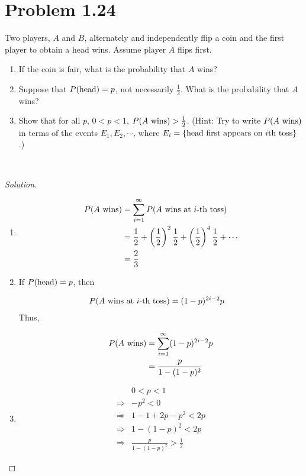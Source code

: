 \documentclass[12pt,letterpaper,reqno]{amsart}
\numberwithin{equation}{subsection}
\begin{document}
\newpage
\section{Problem 1.24}

Two players, $A$ and $B$, alternately and independently flip a coin and the first player to obtain a head wins. Assume player $A$ flips first.

\begin{enumerate}[label=(\alph*),leftmargin=*]
    \item If the coin is fair, what is the probability that $A$ wins?
    \item Suppose that ${P}\! \left( {\mbox{head}} \right) = p$, not necessarily $\frac{1}{2}$. What is the probability that $A$ wins?
    \item Show that for all $p$, $0 < p < 1$, ${P}\! \left( {\mbox{$A$ wins}} \right) > \frac{1}{2}$. (Hint: Try to write ${P}\! \left( {\mbox{$A$ wins}} \right)$ in terms of the events $E_1, E_2, \cdots$, where $E_i = \left\{ {\mbox{head first appears on $i$th toss}} \right\}$.)
\end{enumerate}~\\

\begin{proof}[Solution]~\\

\begin{enumerate}[label=(\alph*),leftmargin=*]
    \item 
    
    \begin{align*}
        {P}\! \left( {\mbox{$A$ wins}} \right) &= \sum_{i=1}^{\infty} {P}\! \left( {\mbox{$A$ wins at $i$-th toss}} \right) \\
        &= \frac{1}{2} + \left(\frac{1}{2} \right)^2 \frac{1}{2} + \left(\frac{1}{2} \right)^4 \frac{1}{2} + \cdots \\
        &= \frac{2}{3}
    \end{align*}
    
    \item If ${P}\! \left( {\mbox{head}} \right) = p$, then
    
    \begin{align*}
        {P}\! \left( {\mbox{$A$ wins at $i$-th toss}} \right) &= (1-p)^{2i-2}p
    \end{align*}
    Thus,
    
    \begin{align*}
        {P}\! \left( {\mbox{$A$ wins}} \right) &= \sum_{i=1}^{\infty} (1-p)^{2i-2}p \\
        &= \frac{p}{1-(1-p)^2}
    \end{align*}
    
    \item
    
    \begin{align*}
        & 0 < p < 1 \\
        \Rightarrow & -p^2 < 0 \\
        \Rightarrow & 1-1+2p-p^2 < 2p \\
        \Rightarrow & 1-(1-p)^2 < 2p \\
        \Rightarrow & \frac{p}{1-(1-p)^2} > \frac{1}{2}
    \end{align*}
\end{enumerate}
\end{proof}
\end{document}

